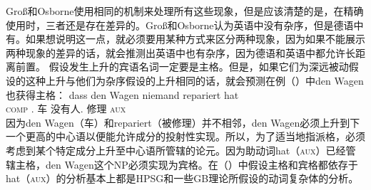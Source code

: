 Groß和Osborne使用相同的机制来处理所有这些现象，但是应该清楚的是，在精确使用时，三者还是存在差异的。Groß和Osborne认为英语中没有杂序，但是德语中有。如果想说明这一点，就必须要用某种方式来区分两种现象，因为如果不能展示两种现象的差异的话，就会推测出英语中也有杂序，因为德语和英语中都允许长距离前置。 \citet[]{GO2009a}假设发生上升的宾语名词一定要是主格。但是，如果它们为深远被动假设的这种上升与他们为杂序假设的上升相同的话，就会预测在例（）中den Wagen也获得主格：
\ea
\gll dass den Wagen niemand repariert hat\\
     \textsc{comp} .\acc{} 车 没有人.\nom{} 修理 \textsc{aux}\\
\z
因为den Wagen（车）和repariert（被修理）并不相邻，den Wagen必须上升到下一个更高的中心语以便能允许成分的投射性实现。所以，为了适当地指派格，必须考虑到某个特定成分上升至中心语所管辖的论元。因为助动词hat（\textsc{aux}）已经管辖主格，den Wagen这个NP必须实现为宾格。在（）中假设主格和宾格都依存于hat（\textsc{aux}）的分析基本上都是HPSG和一些GB理论所假设的动词复杂体的分析。


